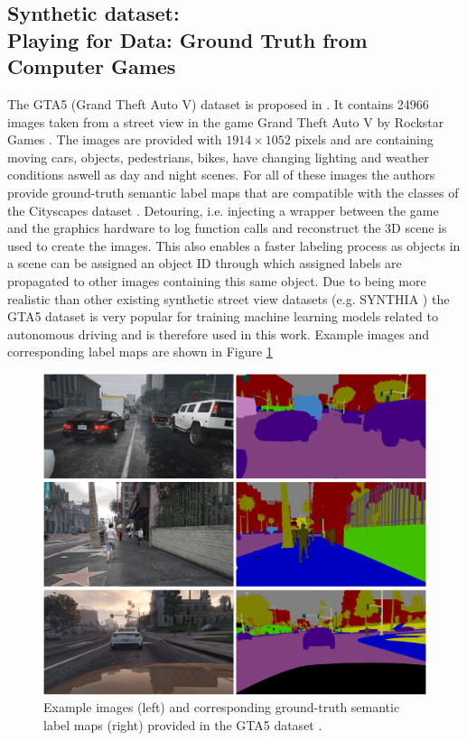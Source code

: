 \subsection{Synthetic dataset: \\
	Playing for Data: Ground Truth from Computer Games}

The GTA5 (Grand Theft Auto V) dataset is proposed in \cite{Richter_2016_ECCV}. It contains 24966 images taken from a street view in the game Grand Theft Auto V by Rockstar Games \cite{GTAV}. The images are provided with $1914 \times 1052$ pixels and are containing moving cars, objects, pedestrians, bikes, have changing lighting and weather conditions aswell as day and night scenes. For all of these images the authors provide ground-truth semantic label maps that are compatible with the classes of the Cityscapes dataset \cite{Cordts_2016_CVPR}. Detouring, i.e. injecting a wrapper between the game and the graphics hardware to log function calls and reconstruct the 3D scene is used to create the images. This also enables a faster labeling process as objects in a scene can be assigned an object ID through which assigned labels are propagated to other images containing this same object. Due to being more realistic than other existing synthetic street view datasets (e.g. SYNTHIA \cite{RosCVPR16}) the GTA5 dataset is very popular for training machine learning models related to autonomous driving and is therefore used in this work. Example images and corresponding label maps are shown in Figure \ref{fig:p4d_examples} 


\begin{figure}
	\centering
	\includegraphics[width=\textwidth]{images/p4d_example.png}
	\caption{Example images (left) and corresponding ground-truth semantic label maps (right) provided in the GTA5 dataset \cite{Richter_2016_ECCV}.}
	\label{fig:p4d_examples}
\end{figure}


